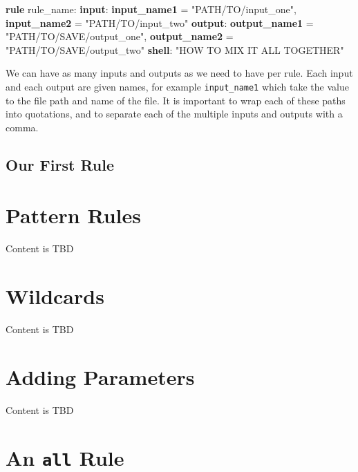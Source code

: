\documentclass[]{book}
\newenvironment{Shaded}{\begin{snugshade}}{\end{snugshade}}
\newcommand{\KeywordTok}[1]{\textcolor[rgb]{0.13,0.29,0.53}{\textbf{{#1}}}}
\newcommand{\StringTok}[1]{\textcolor[rgb]{0.31,0.60,0.02}{{#1}}}
\newcommand{\NormalTok}[1]{{#1}}
\theoremstyle{definition}
\theoremstyle{definition}
\theoremstyle{definition}
\theoremstyle{remark}
\begin{document}
\begin{Shaded}
\begin{Highlighting}[]
\KeywordTok{rule} \NormalTok{rule_name:}
    \KeywordTok{input}\NormalTok{:}
        \KeywordTok{input_name1} \NormalTok{= }\StringTok{"PATH/TO/input_one"}\NormalTok{,}
        \KeywordTok{input_name2} \NormalTok{= }\StringTok{"PATH/TO/input_two"}
    \KeywordTok{output}\NormalTok{:}
        \KeywordTok{output_name1} \NormalTok{= }\StringTok{"PATH/TO/SAVE/output_one"}\NormalTok{,}
        \KeywordTok{output_name2} \NormalTok{= }\StringTok{"PATH/TO/SAVE/output_two"}
    \KeywordTok{shell}\NormalTok{:}
        \StringTok{"HOW TO MIX IT ALL TOGETHER"}
\end{Highlighting}
\end{Shaded}

We can have as many inputs and outputs as we need to have per rule. Each
input and each output are given names, for example \texttt{input\_name1}
which take the value to the file path and name of the file. It is
important to wrap each of these paths into quotations, and to separate
each of the multiple inputs and outputs with a comma.

\section{Our First Rule}\label{our-first-rule}

\chapter{Pattern Rules}\label{pattern-rules}

Content is TBD

\chapter{Wildcards}\label{wildcards}

Content is TBD

\chapter{Adding Parameters}\label{adding-parameters}

Content is TBD

\chapter{\texorpdfstring{An \texttt{all}
Rule}{An all Rule}}\label{an-all-rule}
\end{document}
